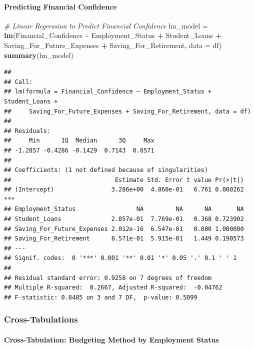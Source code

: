 \documentclass[
]{article}
\newenvironment{Shaded}{\begin{snugshade}}{\end{snugshade}}
\newcommand{\AttributeTok}[1]{\textcolor[rgb]{0.13,0.29,0.53}{#1}}
\newcommand{\CommentTok}[1]{\textcolor[rgb]{0.56,0.35,0.01}{\textit{#1}}}
\newcommand{\FunctionTok}[1]{\textcolor[rgb]{0.13,0.29,0.53}{\textbf{#1}}}
\newcommand{\NormalTok}[1]{#1}
\newcommand{\OtherTok}[1]{\textcolor[rgb]{0.56,0.35,0.01}{#1}}
\newcommand{\SpecialCharTok}[1]{\textcolor[rgb]{0.81,0.36,0.00}{\textbf{#1}}}
\begin{document}
\paragraph{Predicting Financial
Confidence}\label{predicting-financial-confidence}

\begin{Shaded}
\begin{Highlighting}[]
\CommentTok{\# Linear Regression to Predict Financial Confidence}
\NormalTok{lm\_model }\OtherTok{=} \FunctionTok{lm}\NormalTok{(Financial\_Confidence }\SpecialCharTok{\textasciitilde{}}\NormalTok{ Employment\_Status }\SpecialCharTok{+}\NormalTok{ Student\_Loans }\SpecialCharTok{+}\NormalTok{ Saving\_For\_Future\_Expenses }\SpecialCharTok{+}\NormalTok{ Saving\_For\_Retirement, }\AttributeTok{data =}\NormalTok{ df)}
\FunctionTok{summary}\NormalTok{(lm\_model)}
\end{Highlighting}
\end{Shaded}

\begin{verbatim}
## 
## Call:
## lm(formula = Financial_Confidence ~ Employment_Status + Student_Loans + 
##     Saving_For_Future_Expenses + Saving_For_Retirement, data = df)
## 
## Residuals:
##     Min      1Q  Median      3Q     Max 
## -1.2857 -0.4286 -0.1429  0.7143  0.8571 
## 
## Coefficients: (1 not defined because of singularities)
##                             Estimate Std. Error t value Pr(>|t|)    
## (Intercept)                3.286e+00  4.860e-01   6.761 0.000262 ***
## Employment_Status                 NA         NA      NA       NA    
## Student_Loans              2.857e-01  7.769e-01   0.368 0.723902    
## Saving_For_Future_Expenses 2.012e-16  6.547e-01   0.000 1.000000    
## Saving_For_Retirement      8.571e-01  5.915e-01   1.449 0.190573    
## ---
## Signif. codes:  0 '***' 0.001 '**' 0.01 '*' 0.05 '.' 0.1 ' ' 1
## 
## Residual standard error: 0.9258 on 7 degrees of freedom
## Multiple R-squared:  0.2667, Adjusted R-squared:  -0.04762 
## F-statistic: 0.8485 on 3 and 7 DF,  p-value: 0.5099
\end{verbatim}

\subsubsection{Cross-Tabulations}\label{cross-tabulations}

\paragraph{Cross-Tabulation: Budgeting Method by Employment
Status}\label{cross-tabulation-budgeting-method-by-employment-status}
\end{document}
